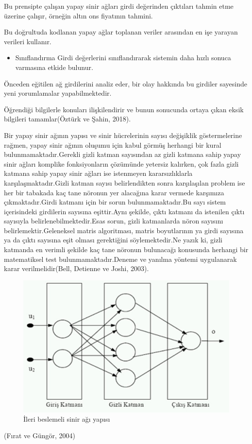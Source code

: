 \documentclass[12pt,twoside]{deuthesis}
\providecommand{\tightlist}{%
  \setlength{\itemsep}{0pt}\setlength{\parskip}{0pt}}
\begin{document}
Bu prensipte çalışan yapay sinir ağları girdi değerinden çıktıları tahmin etme üzerine çalışır, örneğin altın ons fiyatının tahmini.

Bu doğrultuda kodlanan yapay ağlar toplanan veriler arasından en işe yarayan verileri kullanır.
\begin{itemize}
\tightlist
\item
  Sınıflandırma Girdi değerlerini sınıflandırarak sistemin daha hızlı sonuca varmasına etkide bulunur.
\end{itemize}
Önceden eğitilen ağ girdilerini analiz eder, bir olay hakkında bu girdiler sayesinde yeni yorumlamalar yapabilmektedir.

Öğrendiği bilgilerle konuları ilişkilendirir ve bunun sonucunda ortaya çıkan eksik bilgileri tamamlar(Öztürk ve Şahin, 2018).

Bir yapay sinir ağının yapısı ve sinir hücrelerinin sayısı değişiklik göstermelerine rağmen, yapay sinir ağının oluşumu için kabul görmüş herhangi bir kural bulunmamaktadır.Gerekli gizli katman sayısından az gizli katmana sahip yapay sinir ağları komplike fonksiyonların çözümünde yetersiz kalırken, çok fazla gizli katmana sahip yapay sinir ağları ise istenmeyen kararsızlıklarla karşılaşmaktadır.Gizli katman sayısı belirlendikten sonra karşılaşılan problem ise her bir tabakada kaç tane nöronun yer alacağına karar vermede karşımıza çıkmaktadır.Girdi katmanı için bir sorun bulunmamaktadır.Bu sayı sistem içerisindeki girdilerin sayısına eşittir.Aynı şekilde, çıktı katmanı da istenilen çıktı sayısıyla belirlenebilmektedir.Esas sorun, gizli katmanlarda nöron sayısını belirlemektir.Geleneksel matris algoritması, matris boyutlarının ya girdi sayısına ya da çıktı sayısına eşit olması gerektiğini söylemektedir.Ne yazık ki, gizli katmanda en verimli şekilde kaç tane nöronun bulunacağı konusunda herhangi bir matematiksel test bulunmamaktadır.Deneme ve yanılma yöntemi uygulanarak karar verilmelidir(Bell, Detienne ve Joshi, 2003).
\begin{figure}

{\centering \includegraphics[width=1\linewidth,height=0.27\textheight]{figure/ysa_3} 

}

\caption{İleri beslemeli sinir ağı yapısı}\label{fig:ysa3}
\end{figure}
(Fırat ve Güngör, 2004)
\end{document}
